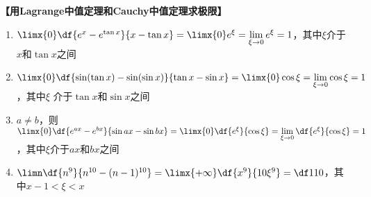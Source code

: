 \bigskip
{\bf 【用Lagrange中值定理和Cauchy中值定理求极限】}

\begin{enumerate}[(1)]
  \setlength{\itemindent}{1cm}
  \item $\limx{0}\df{e^x-e^{\tan x}}{x-\tan x}=\limx{0}e^{\xi}
  =\lim\limits_{\xi\to 0}e^{\xi}=1$，其中$\xi$介于$x$和$\tan x$之间
  \item $\limx{0}\df{\sin(\tan x)-\sin(\sin x)}{\tan x-\sin x}
  =\limx{0}\cos\xi=\lim\limits_{\xi\to 0}\cos\xi=1$，其中$\xi$
  介于$\tan x$和$\sin x$之间
  \item $a\ne b$，则$\limx{0}\df{e^{ax}-e^{bx}}{\sin ax-\sin bx}
  =\limx{0}\df{e^{\xi}}{\cos\xi}=\lim\limits_{\xi\to 0}\df{e^{\xi}}{\cos\xi}
  =1$，其中$\xi$介于$ax$和$bx$之间
  \item $\limn\df{n^9}{n^{10}-(n-1)^{10}}=\limx{+\infty}
  \df{x^9}{10\xi^9}=\df1{10}$，其中$x-1<\xi<x$
\end{enumerate}